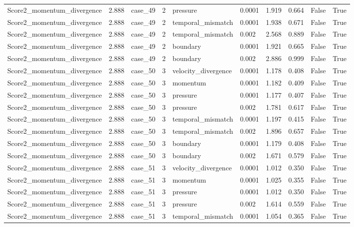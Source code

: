 \begin{longtable}{llllllllll}
Score2\_momentum\_divergence & 2.888 & case\_49 & 2 & pressure & 0.0001 & 1.919 & 0.664 & False & True \\
Score2\_momentum\_divergence & 2.888 & case\_49 & 2 & temporal\_mismatch & 0.0001 & 1.938 & 0.671 & False & True \\
Score2\_momentum\_divergence & 2.888 & case\_49 & 2 & temporal\_mismatch & 0.002 & 2.568 & 0.889 & False & True \\
Score2\_momentum\_divergence & 2.888 & case\_49 & 2 & boundary & 0.0001 & 1.921 & 0.665 & False & True \\
Score2\_momentum\_divergence & 2.888 & case\_49 & 2 & boundary & 0.002 & 2.886 & 0.999 & False & True \\
Score2\_momentum\_divergence & 2.888 & case\_50 & 3 & velocity\_divergence & 0.0001 & 1.178 & 0.408 & False & True \\
Score2\_momentum\_divergence & 2.888 & case\_50 & 3 & momentum & 0.0001 & 1.182 & 0.409 & False & True \\
Score2\_momentum\_divergence & 2.888 & case\_50 & 3 & pressure & 0.0001 & 1.177 & 0.407 & False & True \\
Score2\_momentum\_divergence & 2.888 & case\_50 & 3 & pressure & 0.002 & 1.781 & 0.617 & False & True \\
Score2\_momentum\_divergence & 2.888 & case\_50 & 3 & temporal\_mismatch & 0.0001 & 1.197 & 0.415 & False & True \\
Score2\_momentum\_divergence & 2.888 & case\_50 & 3 & temporal\_mismatch & 0.002 & 1.896 & 0.657 & False & True \\
Score2\_momentum\_divergence & 2.888 & case\_50 & 3 & boundary & 0.0001 & 1.179 & 0.408 & False & True \\
Score2\_momentum\_divergence & 2.888 & case\_50 & 3 & boundary & 0.002 & 1.671 & 0.579 & False & True \\
Score2\_momentum\_divergence & 2.888 & case\_51 & 3 & velocity\_divergence & 0.0001 & 1.012 & 0.350 & False & True \\
Score2\_momentum\_divergence & 2.888 & case\_51 & 3 & momentum & 0.0001 & 1.025 & 0.355 & False & True \\
Score2\_momentum\_divergence & 2.888 & case\_51 & 3 & pressure & 0.0001 & 1.012 & 0.350 & False & True \\
Score2\_momentum\_divergence & 2.888 & case\_51 & 3 & pressure & 0.002 & 1.614 & 0.559 & False & True \\
Score2\_momentum\_divergence & 2.888 & case\_51 & 3 & temporal\_mismatch & 0.0001 & 1.054 & 0.365 & False & True \\

\end{longtable}
